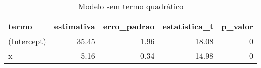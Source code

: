 \begin{table}

\caption{\label{tab:tabela1_exemplo4}Modelo sem termo quadrático}
\centering
\begin{tabular}[t]{l|r|r|r|r}
\hline
termo & estimativa & erro\_padrao & estatistica\_t & p\_valor\\
\hline
(Intercept) & 35.45 & 1.96 & 18.08 & 0\\
\hline
x & 5.16 & 0.34 & 14.98 & 0\\
\hline
\end{tabular}
\end{table}
